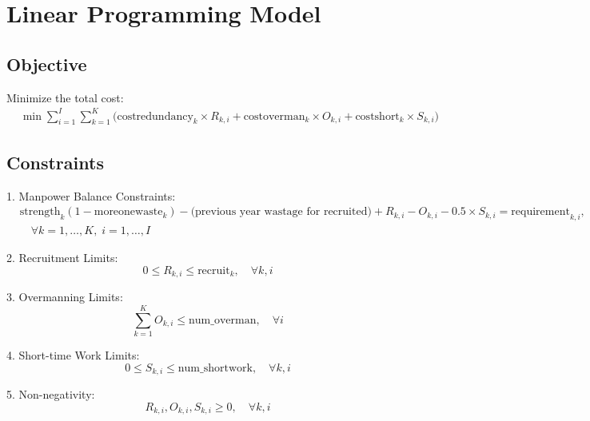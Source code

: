\documentclass{article}
\begin{document}
\section*{Linear Programming Model}

\subsection*{Objective}

Minimize the total cost:
\[
\begin{aligned}
    & \min \sum_{i=1}^{I} \sum_{k=1}^{K} \Big( \text{costredundancy}_k \times R_{k,i} + \text{costoverman}_k \times O_{k,i} + \text{costshort}_k \times S_{k,i} \Big)
\end{aligned}
\]

\subsection*{Constraints}

1. Manpower Balance Constraints:
\[
\begin{aligned}
    & \text{strength}_k (1 - \text{moreonewaste}_k) - \text{(previous year wastage for recruited)} + R_{k,i} - O_{k,i} - 0.5 \times S_{k,i} = \text{requirement}_{k,i}, \\
    & \quad \forall k = 1, \ldots, K,\; i = 1, \ldots, I
\end{aligned}
\]

2. Recruitment Limits:
\[
0 \leq R_{k,i} \leq \text{recruit}_k, \quad \forall k, i
\]

3. Overmanning Limits:
\[
\sum_{k=1}^{K} O_{k,i} \leq \text{num\_overman}, \quad \forall i
\]

4. Short-time Work Limits:
\[
0 \leq S_{k,i} \leq \text{num\_shortwork}, \quad \forall k, i
\]

5. Non-negativity:
\[
R_{k,i}, O_{k,i}, S_{k,i} \geq 0, \quad \forall k, i
\]
\end{document}
